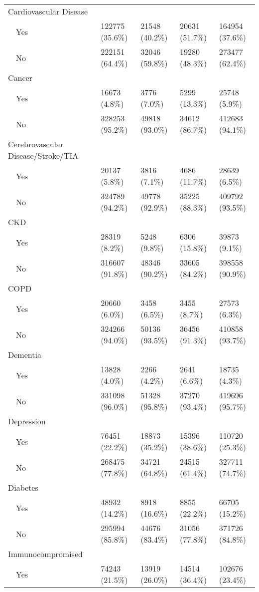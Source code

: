 \begin{table}[!htbp]
\begin{tabular}{lllll}
  Cardiovascular Disease &  &  &  &  \\ 
    Yes & 122775 (35.6\%) & 21548 (40.2\%) & 20631 (51.7\%) & 164954 (37.6\%) \\ 
    No & 222151 (64.4\%) & 32046 (59.8\%) & 19280 (48.3\%) & 273477 (62.4\%) \\ 
  Cancer &  &  &  &  \\ 
    Yes & 16673 (4.8\%) & 3776 (7.0\%) & 5299 (13.3\%) & 25748 (5.9\%) \\ 
    No & 328253 (95.2\%) & 49818 (93.0\%) & 34612 (86.7\%) & 412683 (94.1\%) \\ 
  Cerebrovascular Disease/Stroke/TIA &  &  &  &  \\ 
    Yes & 20137 (5.8\%) & 3816 (7.1\%) & 4686 (11.7\%) & 28639 (6.5\%) \\ 
    No & 324789 (94.2\%) & 49778 (92.9\%) & 35225 (88.3\%) & 409792 (93.5\%) \\ 
  CKD &  &  &  &  \\ 
    Yes & 28319 (8.2\%) & 5248 (9.8\%) & 6306 (15.8\%) & 39873 (9.1\%) \\ 
    No & 316607 (91.8\%) & 48346 (90.2\%) & 33605 (84.2\%) & 398558 (90.9\%) \\ 
  COPD &  &  &  &  \\ 
    Yes & 20660 (6.0\%) & 3458 (6.5\%) & 3455 (8.7\%) & 27573 (6.3\%) \\ 
    No & 324266 (94.0\%) & 50136 (93.5\%) & 36456 (91.3\%) & 410858 (93.7\%) \\ 
  Dementia &  &  &  &  \\ 
    Yes & 13828 (4.0\%) & 2266 (4.2\%) & 2641 (6.6\%) & 18735 (4.3\%) \\ 
    No & 331098 (96.0\%) & 51328 (95.8\%) & 37270 (93.4\%) & 419696 (95.7\%) \\ 
  Depression &  &  &  &  \\ 
    Yes & 76451 (22.2\%) & 18873 (35.2\%) & 15396 (38.6\%) & 110720 (25.3\%) \\ 
    No & 268475 (77.8\%) & 34721 (64.8\%) & 24515 (61.4\%) & 327711 (74.7\%) \\ 
  Diabetes &  &  &  &  \\ 
    Yes & 48932 (14.2\%) & 8918 (16.6\%) & 8855 (22.2\%) & 66705 (15.2\%) \\ 
    No & 295994 (85.8\%) & 44676 (83.4\%) & 31056 (77.8\%) & 371726 (84.8\%) \\ 
  Immunocompromised &  &  &  &  \\ 
    Yes & 74243 (21.5\%) & 13919 (26.0\%) & 14514 (36.4\%) & 102676 (23.4\%) \\ 

\end{tabular}
\end{table}
